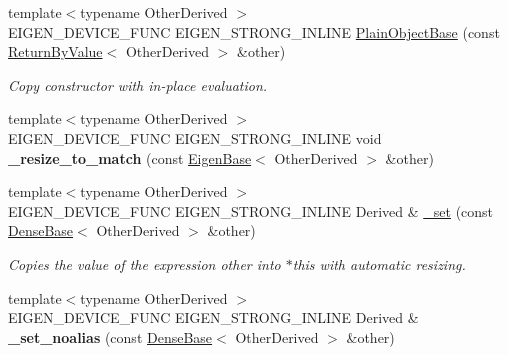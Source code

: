 \begin{DoxyCompactItemize}
{\footnotesize template$<$typename Other\+Derived $>$ }\\E\+I\+G\+E\+N\+\_\+\+D\+E\+V\+I\+C\+E\+\_\+\+F\+U\+NC E\+I\+G\+E\+N\+\_\+\+S\+T\+R\+O\+N\+G\+\_\+\+I\+N\+L\+I\+NE \mbox{\hyperlink{class_eigen_1_1_plain_object_base_abb80b2ee27de8b5d7ef2c8fb403c0068}{Plain\+Object\+Base}} (const \mbox{\hyperlink{class_eigen_1_1_return_by_value}{Return\+By\+Value}}$<$ Other\+Derived $>$ \&other)
\begin{DoxyCompactList}\small\item\em Copy constructor with in-\/place evaluation. \end{DoxyCompactList}\item 
\mbox{\label{class_eigen_1_1_plain_object_base_ac61a071ebfe1068ff76095b617a35e93}} 
{\footnotesize template$<$typename Other\+Derived $>$ }\\E\+I\+G\+E\+N\+\_\+\+D\+E\+V\+I\+C\+E\+\_\+\+F\+U\+NC E\+I\+G\+E\+N\+\_\+\+S\+T\+R\+O\+N\+G\+\_\+\+I\+N\+L\+I\+NE void {\bfseries \+\_\+resize\+\_\+to\+\_\+match} (const \mbox{\hyperlink{struct_eigen_1_1_eigen_base}{Eigen\+Base}}$<$ Other\+Derived $>$ \&other)
\item 
{\footnotesize template$<$typename Other\+Derived $>$ }\\E\+I\+G\+E\+N\+\_\+\+D\+E\+V\+I\+C\+E\+\_\+\+F\+U\+NC E\+I\+G\+E\+N\+\_\+\+S\+T\+R\+O\+N\+G\+\_\+\+I\+N\+L\+I\+NE Derived \& \mbox{\hyperlink{class_eigen_1_1_plain_object_base_aa77dab5e9e6ba9e39740e17cfae78a33}{\+\_\+set}} (const \mbox{\hyperlink{class_eigen_1_1_dense_base}{Dense\+Base}}$<$ Other\+Derived $>$ \&other)
\begin{DoxyCompactList}\small\item\em Copies the value of the expression {\itshape other} into {\ttfamily $\ast$this} with automatic resizing. \end{DoxyCompactList}\item 
\mbox{\label{class_eigen_1_1_plain_object_base_a28cdcf06eb94c404cd327a5b7b806789}} 
{\footnotesize template$<$typename Other\+Derived $>$ }\\E\+I\+G\+E\+N\+\_\+\+D\+E\+V\+I\+C\+E\+\_\+\+F\+U\+NC E\+I\+G\+E\+N\+\_\+\+S\+T\+R\+O\+N\+G\+\_\+\+I\+N\+L\+I\+NE Derived \& {\bfseries \+\_\+set\+\_\+noalias} (const \mbox{\hyperlink{class_eigen_1_1_dense_base}{Dense\+Base}}$<$ Other\+Derived $>$ \&other)
\item 
\mbox{\label{class_eigen_1_1_plain_object_base_ac919a0a42914a190ba025fb8a3467c6b}} 

\end{DoxyCompactItemize}
